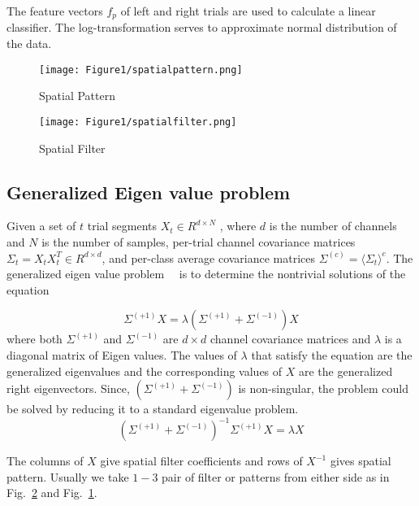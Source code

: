 The feature vectors $f_p$  of left and right trials are used to calculate a linear classifier. The log-transformation serves to approximate normal distribution of the data. 
      
\begin{figure}
\centering
\texttt{[image: Figure1/spatialpattern.png]}
\caption{Spatial Pattern}
\label{SP}
\end{figure}
\begin{figure}
\centering
\texttt{[image: Figure1/spatialfilter.png]}
\caption{Spatial Filter}
\label{SF}
\end{figure}

\subsection{Generalized Eigen value problem}

      Given a set of $t$ trial segments $X_t\in R^{d \times N}$   , where $d$ is the number of channels and $N$ is the number of samples, per-trial channel covariance matrices $\Sigma_t=X_tX_t^T \in R^{d\times d}$, and per-class average covariance matrices $\Sigma^{\left(c\right)}={\langle \Sigma_t\rangle}^c$. The generalized eigen value problem~\cite{18}~\cite{19} is to determine the nontrivial solutions of the equation
      
      \begin{equation}
      \Sigma^{\left(+1\right)}X=\lambda\left(\Sigma^{\left(+1\right)}+\Sigma^{\left(-1\right)}\right) X
      \end{equation}
where both $\Sigma^{\left(+1\right)}$ and $\Sigma^{\left(-1\right)}$ are $d\times d$ channel covariance matrices and $\lambda$ is a diagonal matrix of Eigen values. The values of $\lambda$ that satisfy the equation are the generalized eigenvalues and the corresponding values of $X$ are the generalized right eigenvectors. Since, $ \left(\Sigma^{\left(+1\right)}+\Sigma^{\left(-1\right)}\right) $ is non-singular, the problem could be solved by reducing it to a standard eigenvalue problem.
    \begin{equation}
 \left(\Sigma^{\left(+1\right)}+\Sigma^{\left(-1\right)}\right)^{-1} \Sigma^{\left(+1\right)} X=\lambda X
    \end{equation}
    
    The columns of $X$ give spatial filter coefficients and rows of $X^{-1}$ gives spatial pattern. Usually we take $1-3$ pair of filter or patterns from either side as in Fig.~\ref{SF} and Fig.~\ref{SP}.
    
